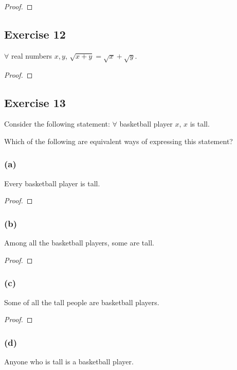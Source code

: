 \documentclass[14pt]{extarticle}
\newcommand{\fa}{\forall}
\begin{document}
\begin{proof}

\end{proof}

\subsection{Exercise 12}
$\fa$ real numbers $x, y$, $\sqrt{x + y} = \sqrt{x} + \sqrt{y}$.
\begin{proof}

\end{proof}

\subsection{Exercise 13}
Consider the following statement: $\fa$ basketball player $x$, $x$ is tall.

Which of the following are equivalent ways of expressing this statement?

\subsubsection{(a)}
Every basketball player is tall.

\begin{proof}

\end{proof}

\subsubsection{(b)}
Among all the basketball players, some are tall.

\begin{proof}

\end{proof}

\subsubsection{(c)}
Some of all the tall people are basketball players.

\begin{proof}

\end{proof}

\subsubsection{(d)}
Anyone who is tall is a basketball player.
\end{document}
